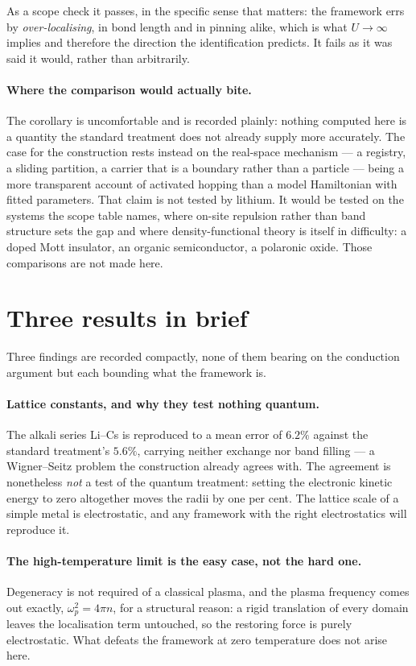 \documentclass[11pt]{article}
\begin{document}
As a scope check it passes, in the specific sense that matters: the framework errs by
\emph{over-localising}, in bond length and in pinning alike, which is what $U\to\infty$ implies and
therefore the direction the identification predicts. It fails as it was said it would, rather than
arbitrarily.

\paragraph{Where the comparison would actually bite.} The corollary is uncomfortable and is recorded
plainly: nothing computed here is a quantity the standard treatment does not already supply more
accurately. The case for the construction rests instead on the real-space mechanism --- a registry,
a sliding partition, a carrier that is a boundary rather than a particle --- being a more transparent
account of activated hopping than a model Hamiltonian with fitted parameters. That claim is not
tested by lithium. It would be tested on the systems the scope table names, where on-site repulsion
rather than band structure sets the gap and where density-functional theory is itself in difficulty:
a doped Mott insulator, an organic semiconductor, a polaronic oxide. Those comparisons are not made
here.

\section{Three results in brief}\label{sec:metals}\label{sec:plasma}\label{sec:fermi}

Three findings are recorded compactly, none of them bearing on the conduction argument but each
bounding what the framework is.

\paragraph{Lattice constants, and why they test nothing quantum.} The alkali series Li--Cs is
reproduced to a mean error of $6.2\%$ against the standard treatment's $5.6\%$, carrying neither
exchange nor band filling --- a Wigner--Seitz problem the construction already agrees with. The
agreement is nonetheless \emph{not} a test of the quantum treatment: setting the electronic kinetic
energy to zero altogether moves the radii by one per cent. The lattice scale of a simple metal is
electrostatic, and any framework with the right electrostatics will reproduce it.

\paragraph{The high-temperature limit is the easy case, not the hard one.} Degeneracy is not
required of a classical plasma, and the plasma frequency comes out exactly, $\omega_p^2=4\pi n$, for
a structural reason: a rigid translation of every domain leaves the localisation term untouched, so
the restoring force is purely electrostatic. What defeats the framework at zero temperature does not
arise here.
\end{document}
